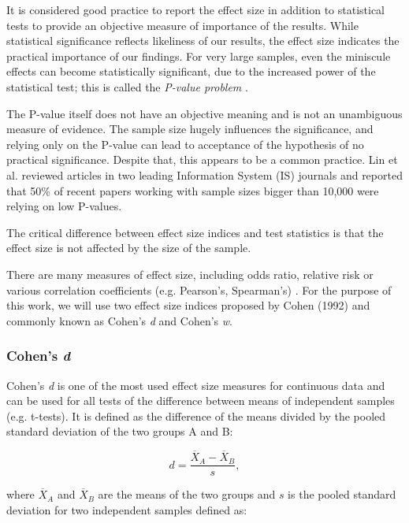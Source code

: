 It is considered good practice to report the effect size in addition to statistical tests to provide an objective measure of importance of the results. While statistical significance reflects likeliness of our results, the effect size indicates the practical importance of our findings. For very large samples, even the miniscule effects can become statistically significant, due to the increased power of the statistical test; this is called the \textit{P-value problem} \cite{pvalueproblem}. 

The P-value itself does not have an objective meaning and is not an unambiguous measure of evidence. The sample size hugely influences the significance, and relying only on the P-value can lead to acceptance of the hypothesis of no practical significance. Despite that, this appears to be a common practice. Lin et al. \cite{pvalueproblem} reviewed articles in two leading Information System (IS) journals and reported that 50\% of recent papers working with sample sizes bigger than 10,000 were relying on low P-values.

The critical difference between effect size indices and test statistics is that the effect size is not affected by the size of the sample.

There are many measures of effect size, including odds ratio, relative risk or various correlation coefficients (e.g. Pearson's, Spearman's) \cite{effect_sizes}. For the purpose of this work, we will use two effect size indices proposed by Cohen (1992) \cite{cohen} and commonly known as Cohen's \textit{d} and Cohen's \textit{w}.

\subsubsection{Cohen's \textit{d}}

Cohen's \textit{d} is one of the most used effect size measures for continuous data and can be used for all tests of the difference between means of independent samples (e.g. t-tests). It is defined as the difference of the means divided by the pooled standard deviation of the two groups A and B: \cite{cohen_book}

\begin{equation}
d = \frac{\overline{X}_A-\overline{X}_B}{s} ,
\end{equation}

where $\overline{X}_A$ and $\overline{X}_B$ are the means of the two groups and $s$ is the pooled standard deviation for two independent samples defined as:

